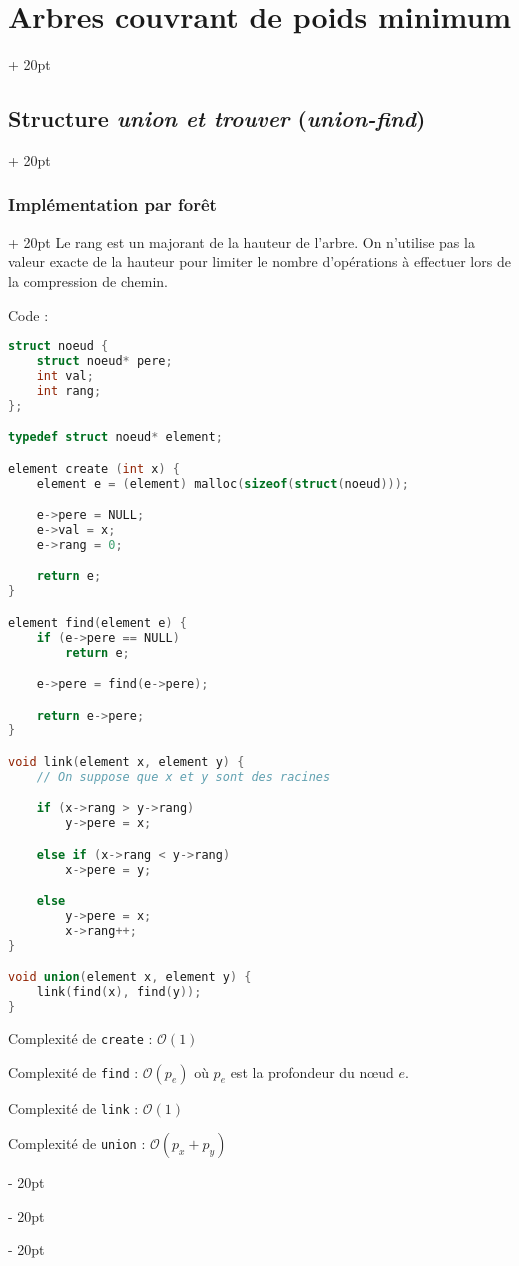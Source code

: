 \documentclass[a4paper, 12pt, twoside]{article}
\newcommand{\ind}[1][20pt]{\advance\leftskip + #1}
\newcommand{\deind}[1][20pt]{\advance\leftskip - #1}
\newenvironment{indt}[2][20pt]{#2 \par \ind[#1]}{\par \deind} %
\begin{document}
\begin{indt}{\section{Arbres couvrant de poids minimum}}
\begin{indt}{\subsection{Structure \textit{union et trouver} (\textit{union-find})}}
\begin{indt}{\subsubsection{Implémentation par forêt}}
                Le rang est un majorant de la hauteur de l'arbre.
                On n'utilise pas la valeur exacte de la hauteur pour limiter le nombre d'opérations à effectuer lors de la compression de chemin.

                Code :

                \begin{lstlisting}[language=C, xleftmargin=80pt]
struct noeud {
    struct noeud* pere;
    int val;
    int rang;
};

typedef struct noeud* element;

element create (int x) {
    element e = (element) malloc(sizeof(struct(noeud)));

    e->pere = NULL;
    e->val = x;
    e->rang = 0;

    return e;
}

element find(element e) {
    if (e->pere == NULL)
        return e;

    e->pere = find(e->pere);

    return e->pere;
}

void link(element x, element y) {
    // On suppose que x et y sont des racines

    if (x->rang > y->rang)
        y->pere = x;

    else if (x->rang < y->rang)
        x->pere = y;

    else
        y->pere = x;
        x->rang++;
}

void union(element x, element y) {
    link(find(x), find(y));
}\end{lstlisting}

                Complexité de \texttt{create} : $\mathcal O(1)$

                Complexité de \texttt{find} : $\mathcal O(p_e)$ où $p_e$ est la profondeur du n\oe ud $e$.

                Complexité de \texttt{link} : $\mathcal O(1)$

                Complexité de \texttt{union} : $\mathcal O(p_x + p_y)$

                \vspace{12pt}
                

\end{indt}
\end{indt}
\end{indt}
\end{document}
